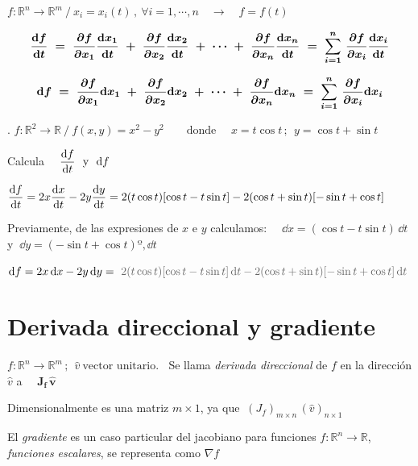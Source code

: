 $f:\mathbb R^n \to \mathbb R^m \ / \ x_i=x_i(t)\, , \ \forall i=1,\cdots, n \quad \to \quad f=f(t)$


\begin{equation}
\label{app.derivada-total}
\boldsymbol{
\displaystyle \dv{f}{t} \ = \ 	\pdv{f}{x_1} \dv{x_1}{t} \ + \ \pdv{f}{x_2} \dv{x_2}{t} \ + \ \cdots \ + \ \pdv{f}{x_n} \dv{x_n}{t} \ = \ \sum_{i=1}^n \, \pdv{f}{x_i} \dv{x_i}{t}    
}
\end{equation}


\begin{equation}
\label{app.diferencial}
\boldsymbol{ \dd f \ = \ \pdv{f}{x_1} \dd x_1 \ + \ \pdv{f}{x_2} \dd x_2 \ + \ \cdots \ + \ \pdv{f}{x_n} \dd x_n \ = \ \sum_{i=1}^n \, \pdv{f}{x_i} \dd x_i
\displaystyle  
}
\end{equation}

\begin{example}
.	$f: \mathbb R^2 \to \mathbb R \ / \ f(x,y)=x^2-y^2 \qquad  \text{donde } \quad x=t\cos t \, ; \ \ y=\cos t + \sin t $ 	

\vspace{3mm} Calcula $\quad \displaystyle \dv{f}{t} \ \text{ y } \ \dd f$
\end{example}


$\displaystyle \dv{f}{t}= 2x \dv{x}{t} - 2y \dv{y}{t} = 2(t\cos t) [\cos t - t\sin t] -2(\cos t + \sin t) [-\sin t + \cos t]$

Previamente, de las expresiones de $x$ e $y$ calculamos: $\quad \dd x=(\cos t - t \sin t )\, \dd t \ $ y $\ \displaystyle \dd y=(-\sin t+\cos t)º, \dd t$

$\displaystyle \dd f = 2x \, \dd x -2y \, \dd y =\ \textcolor{gris}{ 2(t\cos t) [\cos t - t\sin t] \, \dd t  -2(\cos t + \sin t) [-\sin t + \cos t]\, \dd t }$


\section{Derivada direccional y gradiente}

$f:\mathbb R^n \to \mathbb R^m\, ; \ \ \hat v \ \text{vector unitario. } \  $ Se llama \emph{derivada direccional} de $f$ en la dirección $\hat v$ a $\quad \boldsymbol{J_f\, \hat v}$

\textcolor{gris}{Dimensionalmente es una matriz $m \times 1$, ya que $\ (J_f)_{m \times n} \,  ( \hat v )_{n \times 1}$ }


El \emph{gradiente} es un caso particular del jacobiano para funciones $f:\mathbb R^n \to \mathbb R$, \emph{funciones escalares}, se representa como $\nabla f$

